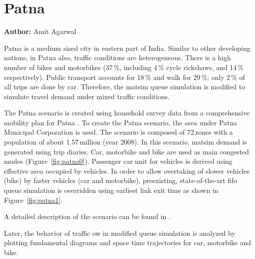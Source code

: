 \section{Patna}
\label{sec:patna}
\hfill \textbf{Author:} Amit Agarwal

Patna is a medium sized city in eastern part of India. Similar to other developing nations, in Patna also, traffic conditions are heterogeneous. There is a high number of bikes and motorbikes (37\,\%, including 4\,\% cycle rickshaws, and 14\,\% respectively). Public transport accounts for 18\,\% and walk for 29\,\%; only 2\,\% of all trips are done by car. Therefore, the \gls{matsim} queue simulation is modified to simulate travel demand under mixed traffic conditions.

The Patna scenario is created using household survey data from a comprehensive mobility plan for Patna \citep[][]{TrippItransVks2009PatnaReport}. To create the Patna scenario, the area under Patna Municipal Corporation is used. The scenario is composed of 72\,zones with a population of about 1.57\,million (year 2008). In this scenario, \gls{matsim} demand is generated using trip diaries. Car, motorbike and bike are used as main congested modes (Figure~\ref{fig:patna0}). Passenger car unit for vehicles is derived using effective area occupied by vehicles. In order to allow overtaking of slower vehicles (bike) by faster vehicles (car and motorbike), preexisting, state-of-the-art \gls{fifo} queue simulation is overridden using earliest link exit time as shown in Figure~\ref{fig:patna1}. 


A detailed description of the scenario can be found in \citet[][]{AgarwalEtcMixedTraffic}.

Later, the behavior of traffic ow in modified queue simulation is analyzed by plotting fundamental diagrams and space time trajectories for car, motorbike and bike.

